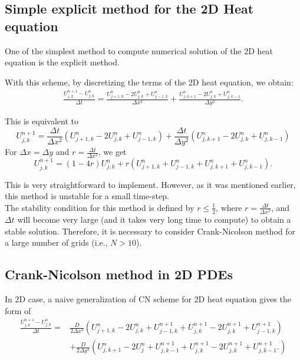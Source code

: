 \documentclass[12pt]{article}		%
\begin{document}
\subsection*{Simple explicit method for the 2D Heat equation}
One of the simplest method to compute numerical solution of the 2D heat equation is the explicit method.

With this scheme, by discretizing the terms of the 2D heat equation, we obtain:
\begin{align*}
	\frac{U_{j,k}^{n+1} - U_{j,k}^{n}}{\Delta t} =  \frac{U_{j+1,k}^{n} - 2 U_{j,k}^{n}+ U_{j-1,k}^{n}}{\Delta x^2} + \frac{U_{j,k+1}^{n} - 2 U_{j,k}^{n}+ U_{j,k-1}^{n}}{\Delta y^2}.
\end{align*}

This is equivalent to
\begin{equation*}
	U_{j,k}^{n+1} =  \frac{\Delta t}{\Delta x^2} \left(U_{j+1,k}^{n} - 2 U_{j,k}^{n}+ U_{j-1,k}^{n} \right) + \frac{\Delta t}{\Delta y^2} \left(U_{j,k+1}^{n} - 2 U_{j,k}^{n}+ U_{j,k-1}^{n} \right)
\end{equation*}
For $\Delta x = \Delta y$ and $r = \frac{\Delta t}{\Delta x^2}$, we get
\begin{equation*}
	U_{j,k}^{n+1} =  (1-4r) U_{j,k}^{n} + r \left(U_{j+1,k}^{n} + U_{j-1,k}^{n} + U_{j,k+1}^{n} + U_{j,k-1}^{n} \right).
\end{equation*}

This is very straightforward to implement. However, as it was mentioned earlier, this method is unstable for a small time-step. \\
The stability condition for this method is defined by $r \leq \frac{1}{2}$, where $r = \frac{\Delta t}{\Delta x^2}$, and $\Delta t$ will become very large (and it takes very long time to compute) to obtain a stable solution. Therefore, it is necessary to consider Crank-Nicolson method for a large number of grids (i.e., $N > 10$).


\subsection*{Crank-Nicolson method in 2D PDEs}
In 2D case, a naive generalization of CN scheme for 2D heat equation gives the form of
\begin{align*}
	\frac{U_{j,k}^{n+1} - U_{j,k}^{n}}{\Delta t} = & \frac{D}{2 \Delta x^2} \left(U_{j+1,k}^{n} - 2U_{j,k}^n + U_{j-1,k}^{n+1} + U_{j,k}^{n+1} - 2 U_{j,k}^{n+1}+ U_{j-1,k}^{n+1} \right) \\
	& + \frac{D}{2 \Delta y^2} \left(U_{j, k+1}^{n} - 2U_j^n + U_{j, k-1}^{n+1} + U_{j,k}^{n+1} - 2 U_{j,k}^{n+1}+ U_{j,k-1}^{n+1} .\right) 
\end{align*}
\end{document}
